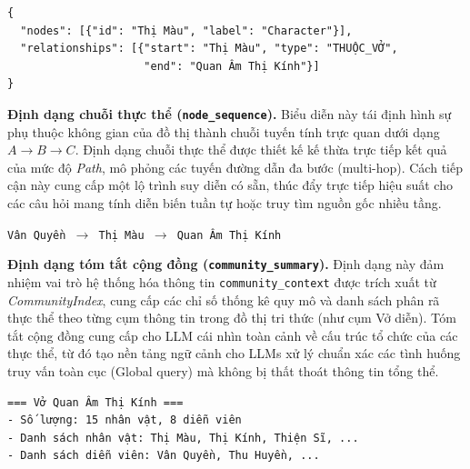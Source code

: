 \vspace{0.5em}
\begin{tcolorbox}[colback=gray!5, colframe=black!50, arc=4pt, boxrule=0.5pt, left=4pt, right=4pt, top=4pt, bottom=4pt, boxsep=0pt]
\small
\begin{verbatim}
{
  "nodes": [{"id": "Thị Màu", "label": "Character"}],
  "relationships": [{"start": "Thị Màu", "type": "THUỘC_VỞ",
                     "end": "Quan Âm Thị Kính"}]
}
\end{verbatim}
\end{tcolorbox}

\textbf{Định dạng chuỗi thực thể (\texttt{node\_sequence}).} Biểu diễn này tái định hình sự phụ thuộc không gian của đồ thị thành chuỗi tuyến tính trực quan dưới dạng $A \rightarrow B \rightarrow C$. Định dạng chuỗi thực thể được thiết kế kế thừa trực tiếp kết quả của mức độ \textit{Path}, mô phỏng các tuyến đường dẫn đa bước (multi-hop). Cách tiếp cận này cung cấp một lộ trình suy diễn có sẵn, thúc đẩy trực tiếp hiệu suất cho các câu hỏi mang tính diễn biến tuần tự hoặc truy tìm nguồn gốc nhiều tầng.

\vspace{0.5em}
\begin{tcolorbox}[colback=gray!5, colframe=black!50, arc=4pt, boxrule=0.5pt, left=4pt, right=4pt, top=4pt, bottom=4pt, boxsep=0pt]
\small \texttt{Vân Quyền $\rightarrow$ Thị Màu $\rightarrow$ Quan Âm Thị Kính}
\end{tcolorbox}

\textbf{Định dạng tóm tắt cộng đồng (\texttt{community\_summary}).} Định dạng này đảm nhiệm vai trò hệ thống hóa thông tin \texttt{community\_context} được trích xuất từ \textit{CommunityIndex}, cung cấp các chỉ số thống kê quy mô và danh sách phân rã thực thể theo từng cụm thông tin trong đồ thị tri thức (như cụm Vở diễn). Tóm tắt cộng đồng cung cấp cho LLM cái nhìn toàn cảnh về cấu trúc tổ chức của các thực thể, từ đó tạo nền tảng ngữ cảnh cho LLMs xử lý chuẩn xác các tình huống truy vấn toàn cục (Global query) mà không bị thất thoát thông tin tổng thể.

\vspace{0.5em}
\begin{tcolorbox}[colback=gray!5, colframe=black!50, arc=4pt, boxrule=0.5pt, left=4pt, right=4pt, top=4pt, bottom=4pt, boxsep=0pt]
\small
\begin{verbatim}
=== Vở Quan Âm Thị Kính ===
- Số lượng: 15 nhân vật, 8 diễn viên
- Danh sách nhân vật: Thị Màu, Thị Kính, Thiện Sĩ, ...
- Danh sách diễn viên: Vân Quyền, Thu Huyền, ...
\end{verbatim}
\end{tcolorbox}

